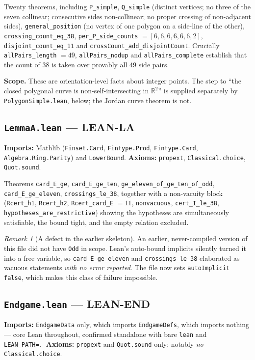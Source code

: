 \documentclass[11pt,a4paper]{article}
\theoremstyle{plain}
\theoremstyle{definition}
\theoremstyle{remark}
\newtheorem*{remark}{Remark}
\begin{document}
Twenty theorems, including \texttt{P\_simple}, \texttt{Q\_simple} (distinct
vertices; no three of the seven collinear; consecutive sides non-collinear; no
proper crossing of non-adjacent sides), \texttt{general\_position} (no vertex of
one polygon on a side-line of the other), \texttt{crossing\_count\_eq\_38},
\texttt{per\_P\_side\_counts} $=[6,6,6,6,6,6,2]$, \texttt{disjoint\_count\_eq\_11}
and \texttt{crossCount\_add\_disjointCount}. Crucially
\texttt{allPairs\_length} $=49$, \texttt{allPairs\_nodup} and
\texttt{allPairs\_complete} establish that the count of $38$ is taken over
provably all $49$ side pairs.

\textbf{Scope.} These are orientation-level facts about integer points. The step
to ``the closed polygonal curve is non-self-intersecting in $\mathbb{R}^2$'' is
supplied separately by \texttt{PolygonSimple.lean}, below; the Jordan curve
theorem is not.

\subsection*{\texttt{LemmaA.lean} --- \textsf{LEAN-LA}}
\textbf{Imports:} Mathlib (\texttt{Finset.Card}, \texttt{Fintype.Prod},
\texttt{Fintype.Card}, \texttt{Algebra.Ring.Parity}) and \texttt{LowerBound}.
\textbf{Axioms:} \texttt{propext}, \texttt{Classical.choice}, \texttt{Quot.sound}.

Theorems \texttt{card\_E\_ge}, \texttt{card\_E\_ge\_ten},
\texttt{ge\_eleven\_of\_ge\_ten\_of\_odd}, \texttt{card\_E\_ge\_eleven},
\texttt{crossings\_le\_38}, together with a non-vacuity block
(\texttt{Rcert\_h1}, \texttt{Rcert\_h2}, \texttt{Rcert\_card\_E} $=11$,
\texttt{nonvacuous}, \texttt{cert\_I\_le\_38},
\texttt{hypotheses\_are\_restrictive}) showing the hypotheses are simultaneously
satisfiable, the bound tight, and the empty relation excluded.

\begin{remark}[A defect in the earlier skeleton]
An earlier, never-compiled version of this file did not have \texttt{Odd} in
scope. Lean's auto-bound implicits silently turned it into a free variable, so
\texttt{card\_E\_ge\_eleven} and \texttt{crossings\_le\_38} elaborated as vacuous
statements \emph{with no error reported}. The file now sets
\texttt{autoImplicit false}, which makes this class of failure impossible.
\end{remark}

\subsection*{\texttt{Endgame.lean} --- \textsf{LEAN-END}}
\textbf{Imports:} \texttt{EndgameData} only, which imports \texttt{EndgameDefs},
which imports nothing --- core Lean throughout, confirmed standalone with bare
\texttt{lean} and \texttt{LEAN\_PATH=.}\ \textbf{Axioms:} \texttt{propext} and
\texttt{Quot.sound} only; notably \emph{no} \texttt{Classical.choice}.
\end{document}
